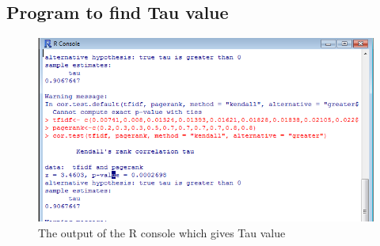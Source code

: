 \documentclass[letterpaper,11pt]{article}
\begin{document}
\subsection*{Program to find Tau value} 

\begin{figure}
\includegraphics[scale=0.7]{output.png}
\caption{The output of the R console which gives Tau value}
\end{figure}
\newpage

 

 
\end{document}
